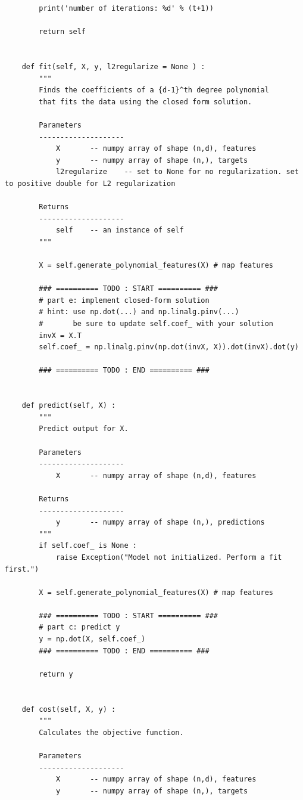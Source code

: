 \documentclass[11pt]{article}
\begin{document}
\begin{verbatim}
        print('number of iterations: %d' % (t+1))
        
        return self
    
    
    def fit(self, X, y, l2regularize = None ) :
        """
        Finds the coefficients of a {d-1}^th degree polynomial
        that fits the data using the closed form solution.
        
        Parameters
        --------------------
            X       -- numpy array of shape (n,d), features
            y       -- numpy array of shape (n,), targets
            l2regularize    -- set to None for no regularization. set to positive double for L2 regularization
                
        Returns
        --------------------        
            self    -- an instance of self
        """
        
        X = self.generate_polynomial_features(X) # map features
        
        ### ========== TODO : START ========== ###
        # part e: implement closed-form solution
        # hint: use np.dot(...) and np.linalg.pinv(...)
        #       be sure to update self.coef_ with your solution
        invX = X.T
        self.coef_ = np.linalg.pinv(np.dot(invX, X)).dot(invX).dot(y)
        
        ### ========== TODO : END ========== ###
    
    
    def predict(self, X) :
        """
        Predict output for X.
        
        Parameters
        --------------------
            X       -- numpy array of shape (n,d), features
        
        Returns
        --------------------
            y       -- numpy array of shape (n,), predictions
        """
        if self.coef_ is None :
            raise Exception("Model not initialized. Perform a fit first.")
        
        X = self.generate_polynomial_features(X) # map features
        
        ### ========== TODO : START ========== ###
        # part c: predict y
        y = np.dot(X, self.coef_)
        ### ========== TODO : END ========== ###
        
        return y
    
    
    def cost(self, X, y) :
        """
        Calculates the objective function.
        
        Parameters
        --------------------
            X       -- numpy array of shape (n,d), features
            y       -- numpy array of shape (n,), targets
        

\end{verbatim}
\end{document}

